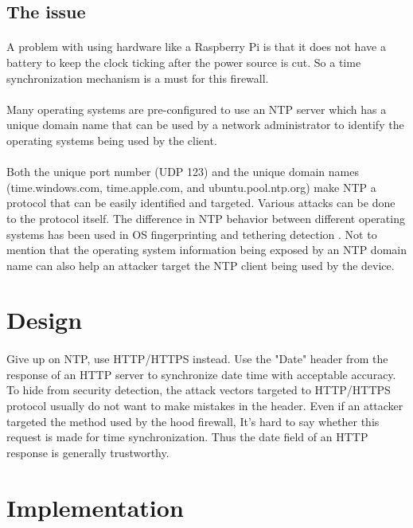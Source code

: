 \documentclass[mscthesis]{usiinfthesis}
\begin{document}
\subsection{The issue}
\paragraph{}
A problem with using hardware like a Raspberry Pi is that it does not have a battery to keep the clock ticking after the power source is cut. So a time synchronization mechanism is a must for this firewall.
\paragraph{}
Many operating systems are pre-configured to use an NTP server which has a unique domain name that can be used by a network administrator to identify the operating systems being used by the client.
\paragraph{}
Both the unique port number (UDP 123) and the unique domain names (time.windows.com, time.apple.com, and ubuntu.pool.ntp.org) make NTP a protocol that can be easily identified and targeted. Various attacks can be done to the protocol itself\citep{ntp:attack}. The difference in NTP behavior between different operating systems has been used in OS fingerprinting and tethering detection \citep{osandtether}. Not to mention that the operating system information being exposed by an NTP domain name can also help an attacker target the NTP client being used by the device.

\section{Design}
\paragraph{}
Give up on NTP, use HTTP/HTTPS instead. Use the "Date" header from the response of an HTTP server to synchronize date time with acceptable accuracy. To hide from security detection, the attack vectors targeted to HTTP/HTTPS protocol usually do not want to make mistakes in the header. Even if an attacker targeted the method used by the hood firewall, It's hard to say whether this request is made for time synchronization. Thus the date field of an HTTP response is generally trustworthy.

\section{Implementation}
\end{document}
